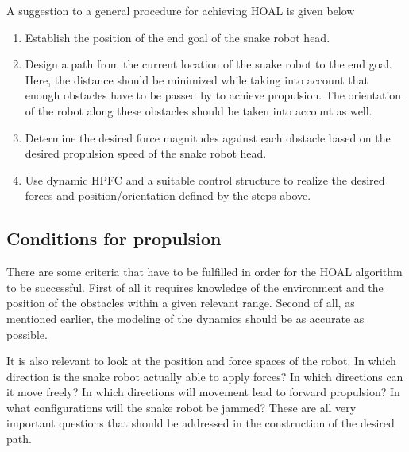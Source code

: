 
A suggestion to a general procedure for achieving HOAL is given below

\begin{enumerate}
    \item Establish the position of the end goal of the snake robot head.
    \item Design a path from the current location of the snake robot to the end goal. Here, the distance should be minimized while taking into account that enough obstacles have to be passed by to achieve propulsion. The orientation of the robot along these obstacles should be taken into account as well.
    \item Determine the desired force magnitudes against each obstacle based on the desired propulsion speed of the snake robot head.
    \item Use dynamic HPFC and a suitable control structure to realize the desired forces and position/orientation defined by the steps above.
\end{enumerate}

\subsection{Conditions for propulsion}\label{subsec:prop-conditions}

There are some criteria that have to be fulfilled in order for the HOAL algorithm to be successful. First of all it requires knowledge of the environment and the position of the obstacles within a given relevant range. Second of all, as mentioned earlier, the modeling of the dynamics should be as accurate as possible.

It is also relevant to look at the position and force spaces of the robot. In which direction is the snake robot actually able to apply forces? In which directions can it move freely? In which directions will movement lead to forward propulsion? In what configurations will the snake robot be jammed? These are all very important questions that should be addressed in the construction of the desired path.

